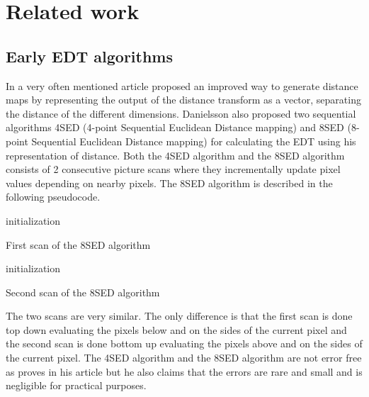\chapter{Related work}\label{cha:relatedwork}
\section{Early EDT algorithms}\label{earlyedt}
In a very often mentioned article \citet{Danielsson} proposed an improved way to generate distance maps by representing the output of the distance transform as a vector, separating the distance of the different dimensions. Danielsson also proposed two sequential algorithms 4SED (4-point Sequential Euclidean Distance mapping) and 8SED (8-point Sequential Euclidean Distance mapping) for calculating the EDT using his representation of distance. Both the 4SED algorithm and the 8SED algorithm consists of 2 consecutive picture scans where they incrementally update pixel values depending on nearby pixels. The 8SED algorithm is described in the following pseudocode.\newpage

\begin{algorithm}[H]
initialization\;
\caption{First scan of the 8SED algorithm}
\end{algorithm}
\begin{algorithm}[H]
initialization\;
\caption{Second scan of the 8SED algorithm}
\end{algorithm}

The two scans are very similar. The only difference is that the first scan is done top down evaluating the pixels below and on the sides of the current pixel and the second scan is done bottom up evaluating the pixels above and on the sides of the current pixel\citep{Ragnemalm:1993}. The 4SED algorithm and the 8SED algorithm are not error free as \citet{Danielsson} proves in his article but he also claims that the errors are rare and small and is negligible for practical purposes.
